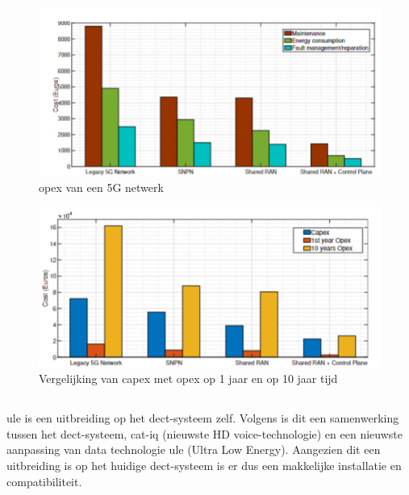 \begin{figure}[H]
  \includegraphics[width=\linewidth]{../graphics/opex.png}
  \caption{\gls{opex} van een 5G netwerk \autocite[Door][Copyright 2024 van]{Hilary2024} \textcite{Hilary2024}}
  \label{fig:opex}
\end{figure}

\begin{figure}[H]
  \includegraphics[width=\linewidth]{../graphics/capex-opex.png}
  \caption{Vergelijking van \gls{capex} met \gls{opex} op 1 jaar en op 10 jaar tijd \autocite[Door][Copyright 2024 van]{Hilary2024} \textcite{Hilary2024}}
  \label{fig:capex-vs-opex}
\end{figure}

\subsection{}%
\label{sec:ule}%

\gls{ule} is een uitbreiding op het \gls{dect}-systeem zelf. Volgens \textcite{GariniDil2014} is dit een samenwerking tussen het \gls{dect}-systeem, \gls{cat-iq} (nieuwste HD voice-technologie) en een nieuwste aanpassing van data technologie \gls{ule} (Ultra Low Energy). Aangezien dit een uitbreiding is op het huidige \gls{dect}-systeem is er dus een makkelijke installatie en compatibiliteit.

